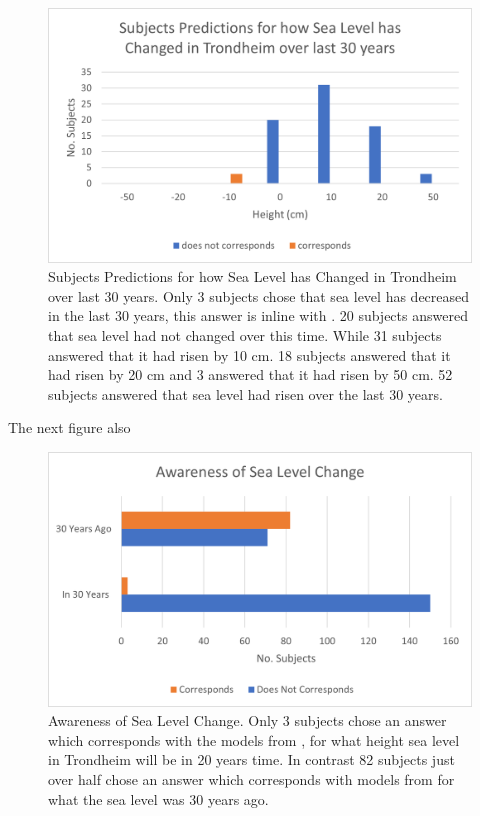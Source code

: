 \begin{figure}[h!]
    \centering
    \includegraphics{fig_results/slr-past.png}
    \caption{Subjects Predictions for how Sea Level has Changed in Trondheim over last 30 years. Only 3 subjects chose that sea level has decreased in the last 30 years, this answer is inline with \cite{kartverket_se_2021}. 20 subjects answered that sea level had not changed over this time. While 31 subjects answered that it had risen by 10 cm. 18 subjects answered that it had risen by 20 cm and 3 answered that it had risen by 50 cm. 52 subjects answered that sea level had risen over the last 30 years. }
    \label{fig:my_label}
\end{figure}

The next figure also 
\begin{figure}[h!]
    \centering
    \includegraphics{fig_results/Aware_sea_level_change.png}
    \caption{Awareness of Sea Level Change. Only 3 subjects chose an answer which corresponds with the models from \cite{kartverket_se_2021}, for what height sea level in Trondheim will be in 20 years time. In contrast 82 subjects just over half chose an answer which corresponds with models from \cite{kartverket_se_2021} for what the sea level was 30 years ago. }
    \label{fig:my_label}
\end{figure}
